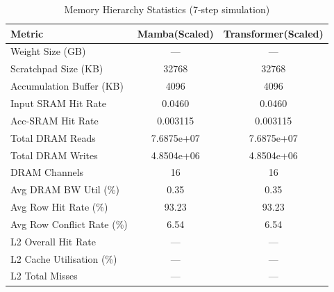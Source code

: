 \begin{table}[h]\centering
    \caption{Memory Hierarchy Statistics (7-step simulation)}
    \label{tab:memory_stats_gen}
    \begin{tabular}{lcc}\hline
    Metric & Mamba(Scaled) & Transformer(Scaled) \\\hline
            Weight Size (GB) & --- & --- \\
        Scratchpad Size (KB) & 32768 & 32768 \\
        Accumulation Buffer (KB) & 4096 & 4096 \\
        Input SRAM Hit Rate & 0.0460 & 0.0460 \\
        Acc-SRAM Hit Rate & 0.003115 & 0.003115 \\
        Total DRAM Reads & 7.6875e+07 & 7.6875e+07 \\
        Total DRAM Writes & 4.8504e+06 & 4.8504e+06 \\
        DRAM Channels & 16 & 16 \\
        Avg DRAM BW Util (\%) & 0.35 & 0.35 \\
        Avg Row Hit Rate (\%) & 93.23 & 93.23 \\
        Avg Row Conflict Rate (\%) & 6.54 & 6.54 \\
        L2 Overall Hit Rate & --- & --- \\
        L2 Cache Utilisation (\%) & --- & --- \\
        L2 Total Misses & --- & --- \\
\hline\end{tabular}\end{table}
